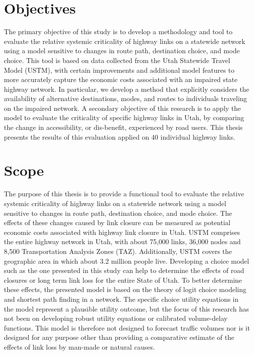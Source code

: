 \section{Objectives}
The primary objective of this study is to develop a methodology and tool to evaluate the
relative systemic criticality of highway links on a statewide network using a model
sensitive to changes in route path, destination choice, and mode choice.
This tool is based on data collected
from the Utah Statewide Travel Model (USTM), with certain improvements and additional model
features to more accurately capture the economic costs associated with an impaired state highway
network. In particular, we develop a method that explicitly considers the availability of
alternative destinations, modes, and routes to individuals traveling on the impaired network. A
secondary objective of this research is to apply the model to evaluate the criticality of
specific
highway links in Utah, by comparing the change in accessibility, or dis-benefit,
experienced by road users.
This thesis presents the results of this evaluation applied
on 40 individual highway links.

\section{Scope}
The purpose of this thesis is to provide a functional tool to evaluate the
relative systemic criticality of highway links on a statewide network using a model
sensitive to changes in route path, destination choice, and mode choice.
The effects of these changes caused by link closure can be measured as potential
economic costs associated with highway link closure in Utah. USTM comprises
the entire highway network in Utah, with about 75,000 links, 36,000 nodes and 8,500 Transportation Analysis Zones (TAZ).
Additionally, USTM covers the geographic area in which about 3.2 million people live.
Developing a choice model such as the one presented in this study can help to determine
the effects of road closures or long term link loss for the entire State of Utah.
To better determine these effects, the presented model is based on the theory of logit choice modeling and
shortest path finding in a network. The specific choice utility equations in the model represent
a plausible utility outcome, but the focus of this research has not been on developing robust
utility equations or calibrated volume-delay functions. This model is therefore not designed to
forecast traffic volumes nor is it designed for any purpose other than providing a comparative estimate
of the effects of link loss by man-made or natural causes.

